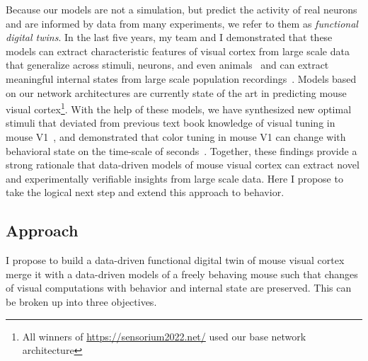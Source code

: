 \documentclass[COG,11pt]{ercgrant}
\begin{document}
Because our models are not a simulation, but predict the activity of real neurons and are informed by data from many experiments, we refer to them as \textit{functional digital twins}.
In the last five years, my team and I demonstrated that these models can extract characteristic features of visual cortex from large scale data that generalize across stimuli, neurons, and even animals~\parencite{Sinz2018-sk,Lurz2020-ua,Cobos2022-rr} and can extract meaningful internal states from large scale population recordings~\parencite{Bashiri2021-or}. 
Models based on our network architectures are currently state of the art in predicting mouse visual cortex\footnote{All winners of  \url{https://sensorium2022.net/} used our base network architecture}. 
With the help of these models, we have synthesized new optimal stimuli that deviated from previous text book knowledge of visual tuning in mouse V1~\parencite{Walker2019-yw}, and demonstrated that color tuning in mouse V1 can change with behavioral state on the time-scale of seconds~\parencite{Franke2022-do}. Together, these findings provide a strong rationale that data-driven models of mouse visual cortex can extract novel and experimentally verifiable insights from large scale data. Here I propose to take the logical next step and extend this approach to behavior. 


\subsection{Approach}
I propose to build a data-driven functional digital twin of mouse visual cortex merge it with a data-driven models of a freely behaving mouse such that changes of visual computations with behavior and internal state are preserved. 
This can be broken up into three objectives.
\end{document}
